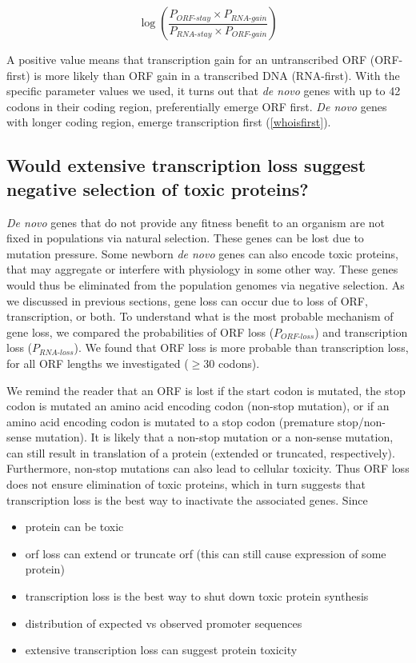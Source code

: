 \documentclass[12pt,a4paper]{article}
\begin{document}
$$\log\left(\frac{P_\textit{ORF-stay}\times P_\textit{RNA-gain}}{P_\textit{RNA-stay}\times P_\textit{ORF-gain}}\right)$$

A positive value means that transcription gain for an untranscribed ORF (ORF-first) is more likely than ORF gain in a transcribed DNA (RNA-first). With the specific parameter values we used, it turns out that \textit{de novo} genes with up to 42 codons in their coding region, preferentially emerge ORF first. \textit{De novo} genes with longer coding region, emerge transcription first (\autoref{whoisfirst}).

\subsection{Would extensive transcription loss suggest negative selection of toxic proteins?}

\textit{De novo} genes that do not provide any fitness benefit to an organism are not fixed in populations via natural selection. These genes can be lost due to mutation pressure. Some newborn \textit{de novo} genes can also encode toxic proteins, that may aggregate or interfere with physiology in some other way. These genes would thus be eliminated from the population genomes via negative selection. As we discussed in previous sections, gene loss can occur due to loss of ORF, transcription, or both. To understand what is the most probable mechanism of gene loss, we compared the probabilities of ORF loss ($P_\textit{ORF-loss}$) and transcription loss ($P_\textit{RNA-loss}$). We found that ORF loss is more probable than transcription loss, for all ORF lengths we investigated ($\geq$30 codons).

We remind the reader that an ORF is lost if the start codon is mutated, the stop codon is mutated an amino acid encoding codon (non-stop mutation), or if an amino acid encoding codon is mutated to a stop codon (premature stop/non-sense mutation). It is likely that a non-stop mutation or a non-sense mutation, can still result in translation of a protein (extended or truncated, respectively). Furthermore, non-stop mutations can also lead to cellular toxicity. Thus ORF loss does not ensure elimination of toxic proteins, which in turn suggests that transcription loss is the best way to inactivate the associated genes. Since 

\begin{itemize}
\item protein can be toxic
\item orf loss can extend or truncate orf (this can still cause expression of some protein)
\item transcription loss is the best way to shut down toxic protein synthesis
\item distribution of expected vs observed promoter sequences
\item extensive transcription loss can suggest protein toxicity
\end{itemize}
\end{document}
